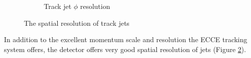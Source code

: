 \begin{figure}
\begin{subfigure}{0.4\textwidth}
        \caption{Track jet $\phi$ resolution}
        \label{fig:track_phi_resolution}
    \end{subfigure}
    \caption{The spatial resolution of track jets}
    \label{fig:track_spatial_reso_scale}
\end{figure}

In addition to the excellent momentum scale and resolution the ECCE tracking system offers, the detector offers very good spatial resolution of jets (Figure \ref{fig:track_spatial_reso_scale}).  